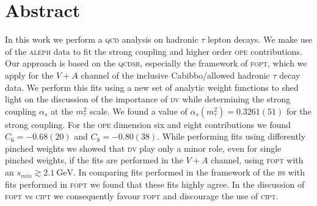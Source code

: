 \documentclass[../../index.tex]{subfiles}
\begin{document}
\chapter*{Abstract}
In this work we perform a \textsc{qcd} analysis on hadronic \(\tau\) lepton
decays. We make use of the \textsc{aleph} data to fit the strong coupling and
higher order \textsc{ope} contributions. Our approach is based on the
\textsc{qcdsr}, especially the framework of \textsc{fopt}, which we apply for
the \(V+A\) channel of the inclusive Cabibbo\-/allowed hadronic \(\tau\) decay
data. We perform this fits using a new set of analytic weight functions to shed
light on the discussion of the importance of \textsc{dv} while determining the
strong coupling \(\alpha_s\) at the \(m_\tau^2\) scale. We found a value of
\(\alpha_s(m_\tau^2) = 0.3261(51) \) for the strong coupling. For the
\textsc{ope} dimension six and eight contributions we found \(C_6 = -0.68(20)\)
and \(C_8 = -0.80(38) \). While performing fits using differently pinched
weights we showed that \textsc{dv} play only a minor role, even for single
pinched weights, if the fits are performed in the \(V+A\) channel, using
\textsc{fopt} with an \(s_{min} \gtrsim \SI{2.1}{\giga\eV}\). In comparing
fits performed in the framework of the \textsc{bs} with fits performed in
\textsc{fopt} we found that these fits highly agree. In the discussion of
\textsc{fopt} vs \textsc{cipt} we consequently favour \textsc{fopt} and
discourage the use of \textsc{cipt}.
\end{document}
